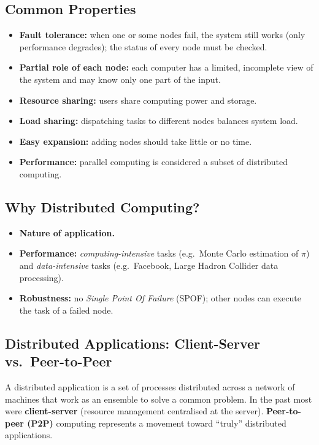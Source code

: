 \subsection{Common Properties}
\begin{itemize}[leftmargin=*]
  \item \textbf{Fault tolerance:} when one or some nodes fail, the system still works
        (only performance degrades); the status of every node must be checked.
  \item \textbf{Partial role of each node:} each computer has a limited, incomplete view of
        the system and may know only one part of the input.
  \item \textbf{Resource sharing:} users share computing power and storage.
  \item \textbf{Load sharing:} dispatching tasks to different nodes balances system load.
  \item \textbf{Easy expansion:} adding nodes should take little or no time.
  \item \textbf{Performance:} parallel computing is considered a subset of distributed computing.
\end{itemize}

\subsection{Why Distributed Computing?}
\begin{itemize}[leftmargin=*]
  \item \textbf{Nature of application.}
  \item \textbf{Performance:} \emph{computing-intensive} tasks (e.g.\ Monte Carlo
        estimation of $\pi$) and \emph{data-intensive} tasks (e.g.\ Facebook, Large Hadron
        Collider data processing).
  \item \textbf{Robustness:} no \emph{Single Point Of Failure} (SPOF); other nodes can execute
        the task of a failed node.
\end{itemize}

\subsection{Distributed Applications: Client-Server vs.\ Peer-to-Peer}
A distributed application is a set of processes distributed across a network of machines that
work as an ensemble to solve a common problem. In the past most were \textbf{client-server}
(resource management centralised at the server). \textbf{Peer-to-peer (P2P)} computing
represents a movement toward ``truly'' distributed applications.

